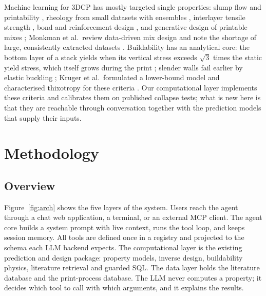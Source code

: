 \documentclass[preprint,12pt]{elsarticle}
\begin{document}
Machine learning for 3DCP has mostly targeted single properties: slump flow and printability \cite{malik2024mixdesign3dcp}, rheology from small datasets with ensembles \cite{zafar2025ensemblerheology}, interlayer tensile strength \cite{ali2023mltensile3dcp}, bond and reinforcement design \cite{ma2024trustworthyml3dcp}, and generative design of printable mixes \cite{wang2024deepgenerative3dcp}; Monkman et al.\ review data-driven mix design and note the shortage of large, consistently extracted datasets \cite{monkman2026datadrivenreview}. Buildability has an analytical core: the bottom layer of a stack yields when its vertical stress exceeds $\sqrt{3}$ times the static yield stress, which itself grows during the print \cite{roussel2018rheological,perrot2016structural,reiter2018role}; slender walls fail earlier by elastic buckling \cite{suiker2018mechanical,wolfs2018early}; Kruger et al.\ formulated a lower-bound model and characterised thixotropy for these criteria \cite{kruger2019lowerbound,kruger2019thixotropy}. Our computational layer implements these criteria and calibrates them on published collapse tests; what is new here is that they are reachable through conversation together with the prediction models that supply their inputs.

\section{Methodology}\label{sec:method}

\subsection{Overview}

Figure~\ref{fig:arch} shows the five layers of the system. Users reach the agent through a chat web application, a terminal, or an external MCP client. The agent core builds a system prompt with live context, runs the tool loop, and keeps session memory. All tools are defined once in a registry and projected to the schema each LLM backend expects. The computational layer is the existing prediction and design package: property models, inverse design, buildability physics, literature retrieval and guarded SQL. The data layer holds the literature database and the print-process database. The LLM never computes a property; it decides which tool to call with which arguments, and it explains the results.
\end{document}
